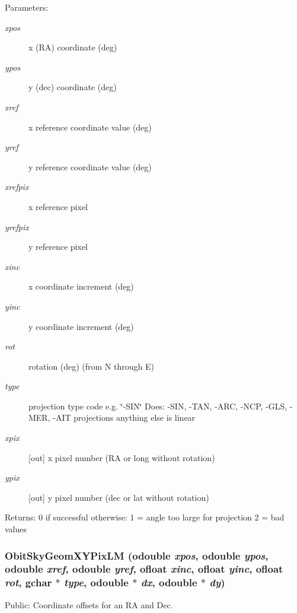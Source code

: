 \begin{Desc}
\item[Parameters:]
\begin{description}
\item[{\em xpos}]x (RA) coordinate (deg) \item[{\em ypos}]y (dec) coordinate (deg) \item[{\em xref}]x reference coordinate value (deg) \item[{\em yref}]y reference coordinate value (deg) \item[{\em xrefpix}]x reference pixel \item[{\em yrefpix}]y reference pixel \item[{\em xinc}]x coordinate increment (deg) \item[{\em yinc}]y coordinate increment (deg) \item[{\em rot}]rotation (deg) (from N through E) \item[{\em type}]projection type code e.g. \char`\"{}-SIN\char`\"{} Does: -SIN, -TAN, -ARC, -NCP, -GLS, -MER, -AIT projections anything else is linear \item[{\em xpix}][out] x pixel number (RA or long without rotation) \item[{\em ypix}][out] y pixel number (dec or lat without rotation) \end{description}
\end{Desc}
\begin{Desc}
\item[Returns:]0 if successful otherwise: 1 = angle too large for projection 2 = bad values \end{Desc}
\subsubsection{ Obit\-Sky\-Geom\-XYPix\-LM ({\bf odouble} {\em xpos}, {\bf odouble} {\em ypos}, {\bf odouble} {\em xref}, {\bf odouble} {\em yref}, {\bf ofloat} {\em xinc}, {\bf ofloat} {\em yinc}, {\bf ofloat} {\em rot}, gchar $\ast$ {\em type}, {\bf odouble} $\ast$ {\em dx}, {\bf odouble} $\ast$ {\em dy})}\label{ObitSkyGeom_8c_a13}


Public: Coordinate offsets for an RA and Dec. 

